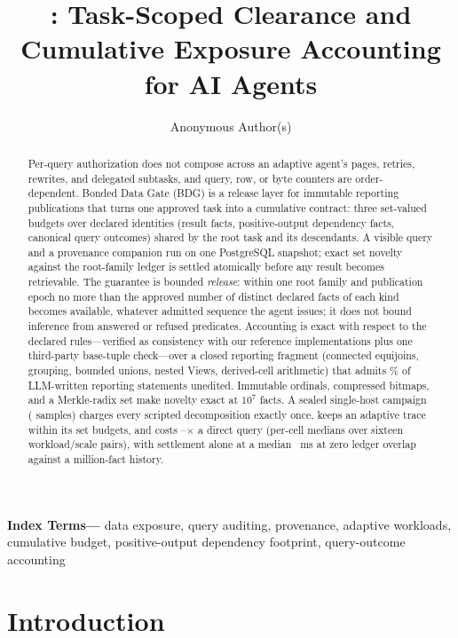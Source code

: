 \documentclass[10pt,journal,compsoc]{IEEEtran}
\title{\systemname: Task-Scoped Clearance and Cumulative Exposure
Accounting for AI Agents}
\author{Anonymous Author(s)}
\date{}
\newenvironment{IEEEkeywords}{\par\small\noindent\textbf{Index Terms---}}{\par}
\newcommand{\systemname}{Bonded Data Gate}
\begin{document}
\maketitle

\begin{abstract}
Per-query authorization does not compose across an adaptive agent's pages,
retries, rewrites, and delegated subtasks, and query, row, or byte counters
are order-dependent. \systemname{} (BDG) is a release layer for immutable
reporting publications that turns one approved task into a cumulative
contract: three set-valued budgets over declared identities (result facts,
positive-output dependency facts, canonical query outcomes) shared by the
root task and its descendants. A visible query and a provenance companion
run on one PostgreSQL snapshot; exact set novelty against the root-family
ledger is settled atomically before any result becomes retrievable. The
guarantee is bounded \emph{release}: within one root family and publication
epoch no more than the approved number of distinct declared facts of each
kind becomes available, whatever admitted sequence the agent issues; it does
not bound inference from answered or refused predicates. Accounting is exact
with respect to the declared rules---verified as consistency with our
reference implementations plus one third-party base-tuple check---over a
closed reporting fragment (connected equijoins, grouping, bounded unions,
nested Views, derived-cell arithmetic) that admits
\AgentWorkloadLowerablePct\% of \AgentWorkloadQueries{} LLM-written
reporting statements unedited. Immutable ordinals, compressed
bitmaps, and a Merkle-radix set make novelty exact at $10^7$ facts. A sealed
single-host campaign (\FinalVFivePublicationMeasuredSamples{} samples)
charges every scripted decomposition exactly once, keeps an adaptive trace
within its set budgets, and costs
\FinalVFivePublicationOverheadMin{}--\FinalVFivePublicationOverheadMax{}$\times$
a direct query (per-cell medians over sixteen workload/scale pairs), with
settlement alone at a median \FinalVFivePublicationScaleSettleMillionMS{}~ms
at zero ledger overlap against a million-fact history.
\end{abstract}

\begin{IEEEkeywords}
data exposure, query auditing, provenance, adaptive workloads, cumulative
budget, positive-output dependency footprint, query-outcome accounting
\end{IEEEkeywords}

\section{Introduction}
\label{sec:introduction}
\end{document}
